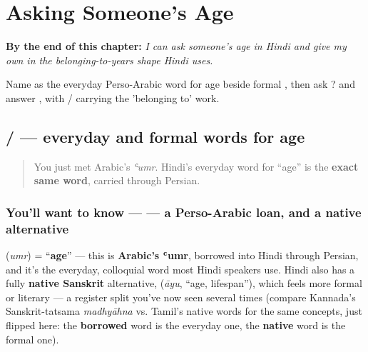 
\chapter{Asking Someone's Age}
\label{ch:hi-asking-age}

\begin{chapteropening}
\textbf{By the end of this chapter:} \emph{I can ask someone's age in Hindi and give my own in the belonging-to-years shape Hindi uses.}

Name  as the everyday Perso-Arabic word for age beside formal , then ask     ? and answer     , with / carrying the 'belonging to' work.
\end{chapteropening}

\section[\texorpdfstring{\hi{उम्र} / \hi{आयु} (umr / āyu)}{उम्र / आयु (umr / āyu)}]{ /  — everyday and formal words for age}

\label{lesson:HI-C19-umr}



\begin{quote}
You just met Arabic's \emph{ʿumr}. Hindi's everyday word for \textquotedblleft{}age\textquotedblright{} is the \textbf{exact same word}, carried through Persian.
\end{quote}

\subsection*{You'll want to know —  — a Perso-Arabic loan, and a native alternative}
\textbf{} (\emph{umr}) = \textquotedblleft{}\textbf{age}\textquotedblright{} — this is \textbf{Arabic's ʿumr}, borrowed into Hindi through Persian, and it's the everyday, colloquial word most Hindi speakers use. Hindi also has a fully \textbf{native Sanskrit} alternative, \textbf{} (\emph{āyu}, \textquotedblleft{}age, lifespan\textquotedblright{}), which feels more formal or literary — a register split you've now seen several times (compare Kannada's Sanskrit-tatsama \emph{madhyāhna} vs. Tamil's native words for the same concepts, just flipped here: the \textbf{borrowed} word is the everyday one, the \textbf{native} word is the formal one).

